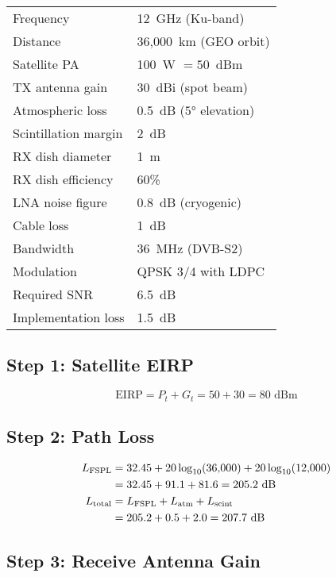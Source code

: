 \begin{tabular}{@{}ll@{}}
Frequency & 12~GHz (Ku-band) \\
Distance & 36,000~km (GEO orbit) \\
Satellite PA & 100~W $= 50$~dBm \\
TX antenna gain & 30~dBi (spot beam) \\
Atmospheric loss & 0.5~dB ($5°$ elevation) \\
Scintillation margin & 2~dB \\
RX dish diameter & 1~m \\
RX dish efficiency & 60\% \\
LNA noise figure & 0.8~dB (cryogenic) \\
Cable loss & 1~dB \\
Bandwidth & 36~MHz (DVB-S2) \\
Modulation & QPSK 3/4 with LDPC \\
Required SNR & 6.5~dB \\
Implementation loss & 1.5~dB \\
\end{tabular}

\subsection*{Step 1: Satellite EIRP}

\begin{equation}
\text{EIRP} = P_t + G_t = 50 + 30 = 80\text{~dBm}
\label{eq:ex2-eirp}
\end{equation}

\subsection*{Step 2: Path Loss}

\begin{align}
L_{\text{FSPL}} &= 32.45 + 20\log_{10}(36{,}000) + 20\log_{10}(12{,}000) \notag \\
&= 32.45 + 91.1 + 81.6 = 205.2\text{~dB} \notag \\
L_{\text{total}} &= L_{\text{FSPL}} + L_{\text{atm}} + L_{\text{scint}} \notag \\
&= 205.2 + 0.5 + 2.0 = 207.7\text{~dB}
\label{eq:ex2-path-loss}
\end{align}

\subsection*{Step 3: Receive Antenna Gain}

